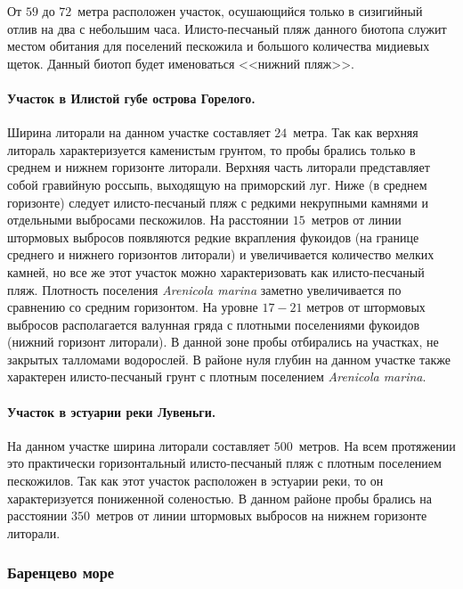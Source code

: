 От $59$ до $72$~метра расположен участок, осушающийся только в сизигийный отлив на два с небольшим часа. 
Илисто-песчаный пляж данного биотопа служит местом обитания для поселений пескожила и большого количества мидиевых щеток. 
Данный биотоп будет именоваться <<нижний пляж>>. 


\paragraph{Участок в Илистой губе острова Горелого.}
Ширина литорали на данном участке составляет $24$~метра. 
Так как верхняя литораль характеризуется каменистым грунтом, то пробы брались только в среднем и нижнем горизонте литорали.
Верхняя часть литорали представляет собой гравийную россыпь, выходящую на приморский луг. 
Ниже (в среднем горизонте) следует илисто-песчаный пляж с редкими некрупными камнями и отдельными выбросами пескожилов.  
На расстоянии $15$~метров от линии штормовых выбросов появляются редкие вкрапления фукоидов (на границе среднего и нижнего горизонтов литорали) и увеличивается количество мелких камней, но  все же этот участок можно характеризовать как илисто-песчаный пляж. 
Плотность поселения {\it Arenicola marina} заметно увеличивается по сравнению со средним горизонтом.
На уровне $17-21$ метров от штормовых выбросов располагается валунная гряда с плотными поселениями фукоидов (нижний горизонт литорали). 
В данной зоне пробы отбирались на участках, не закрытых талломами водорослей. 
В районе нуля глубин на данном участке также характерен илисто-песчаный грунт с плотным поселением {\it Arenicola marina}.


\paragraph{Участок в эстуарии реки Лувеньги.}
На данном участке ширина литорали составляет $500$~метров. 
На всем протяжении это практически горизонтальный илисто-песчаный пляж с плотным поселением пескожилов. 
Так как этот участок расположен в эстуарии реки, то он характеризуется пониженной соленостью. 
В данном районе пробы брались на расстоянии $350$~метров от линии штормовых выбросов на нижнем горизонте литорали.


            \subsubsection{Баренцево море}

